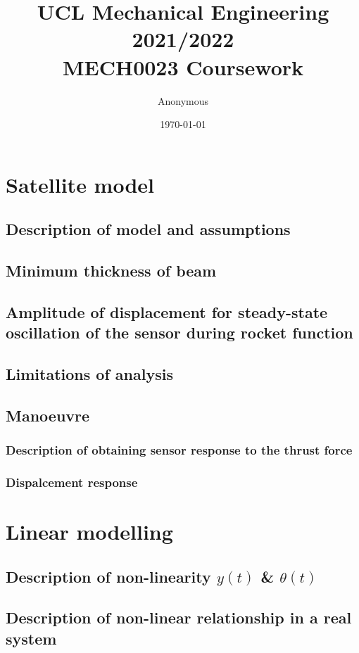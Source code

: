 \documentclass[11pt]{article}
\numberwithin{equation}{section}
\begin{document}
\title{\textbf{UCL Mechanical Engineering 2021/2022}\\MECH0023 Coursework}
\author{Anonymous}
\date{\today}
\maketitle
\tableofcontents
\listoffigures
\section{Satellite model}
\subsection{Description of model and assumptions}
\subsection{Minimum thickness of beam}
\subsection{Amplitude of displacement for steady-state oscillation of the sensor during rocket function}
\subsection{Limitations of analysis}
\subsection{Manoeuvre}
\subsubsection{Description of obtaining sensor response to the thrust force}
\subsubsection{Dispalcement response}
\section{Linear modelling}
\subsection{Description of non-linearity $y(t)$ \& $\theta(t)$}
\subsection{Description of non-linear relationship in a real system}
\end{document}

